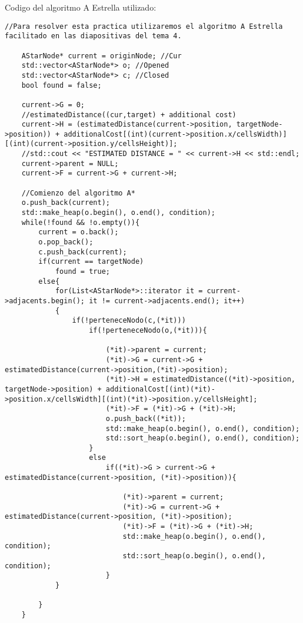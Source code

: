 Codigo del algoritmo A Estrella utilizado:
\\
\begin{lstlisting}
//Para resolver esta practica utilizaremos el algoritmo A Estrella facilitado en las diapositivas del tema 4.

    AStarNode* current = originNode; //Cur
    std::vector<AStarNode*> o; //Opened
    std::vector<AStarNode*> c; //Closed
    bool found = false;

    current->G = 0;
    //estimatedDistance((cur,target) + additional cost)
    current->H = (estimatedDistance(current->position, targetNode->position)) + additionalCost[(int)(current->position.x/cellsWidth)][(int)(current->position.y/cellsHeight)];
    //std::cout << "ESTIMATED DISTANCE = " << current->H << std::endl;
    current->parent = NULL;
    current->F = current->G + current->H;

    //Comienzo del algoritmo A*
    o.push_back(current);
    std::make_heap(o.begin(), o.end(), condition);
    while(!found && !o.empty()){
        current = o.back();
        o.pop_back();
        c.push_back(current);
        if(current == targetNode)
            found = true;
        else{
            for(List<AStarNode*>::iterator it = current->adjacents.begin(); it != current->adjacents.end(); it++)
            {
                if(!perteneceNodo(c,(*it)))
                    if(!perteneceNodo(o,(*it))){
                        
                        (*it)->parent = current;
                        (*it)->G = current->G + estimatedDistance(current->position,(*it)->position);
                        (*it)->H = estimatedDistance((*it)->position, targetNode->position) + additionalCost[(int)(*it)->position.x/cellsWidth][(int)(*it)->position.y/cellsHeight];
                        (*it)->F = (*it)->G + (*it)->H;
                        o.push_back((*it));
                        std::make_heap(o.begin(), o.end(), condition);
                        std::sort_heap(o.begin(), o.end(), condition);
                    }
                    else
                        if((*it)->G > current->G + estimatedDistance(current->position, (*it)->position)){
                            
                            (*it)->parent = current;
                            (*it)->G = current->G + estimatedDistance(current->position, (*it)->position);
                            (*it)->F = (*it)->G + (*it)->H;
                            std::make_heap(o.begin(), o.end(), condition);
                            std::sort_heap(o.begin(), o.end(), condition);
                        }
            }
                
        }
    }
\end{lstlisting}
